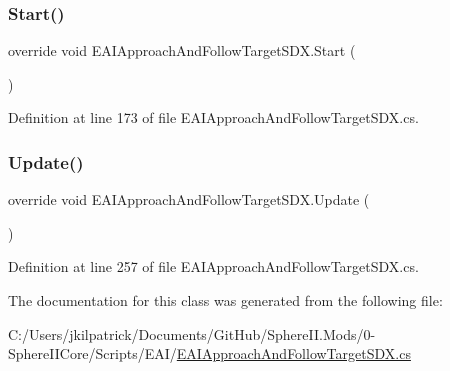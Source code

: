 \subsubsection{\texorpdfstring{Start()}{Start()}}
{\footnotesize\ttfamily override void E\+A\+I\+Approach\+And\+Follow\+Target\+S\+D\+X.\+Start (\begin{DoxyParamCaption}{ }\end{DoxyParamCaption})}



Definition at line 173 of file E\+A\+I\+Approach\+And\+Follow\+Target\+S\+D\+X.\+cs.

\mbox{\label{class_e_a_i_approach_and_follow_target_s_d_x_af6a82c01d51c142df19ce0ae9f24d722}} 
\subsubsection{\texorpdfstring{Update()}{Update()}}
{\footnotesize\ttfamily override void E\+A\+I\+Approach\+And\+Follow\+Target\+S\+D\+X.\+Update (\begin{DoxyParamCaption}{ }\end{DoxyParamCaption})}



Definition at line 257 of file E\+A\+I\+Approach\+And\+Follow\+Target\+S\+D\+X.\+cs.



The documentation for this class was generated from the following file\+:\begin{DoxyCompactItemize}
\item 
C\+:/\+Users/jkilpatrick/\+Documents/\+Git\+Hub/\+Sphere\+I\+I.\+Mods/0-\/\+Sphere\+I\+I\+Core/\+Scripts/\+E\+A\+I/\mbox{\hyperlink{_e_a_i_approach_and_follow_target_s_d_x_8cs}{E\+A\+I\+Approach\+And\+Follow\+Target\+S\+D\+X.\+cs}}\end{DoxyCompactItemize}

